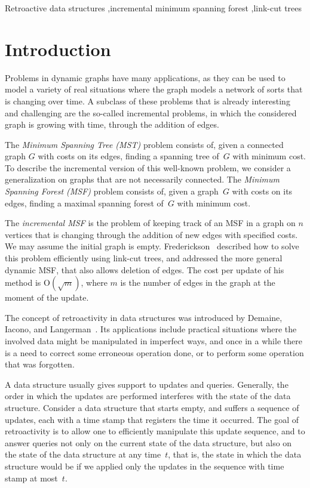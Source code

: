 \documentclass[3p,times,procedia]{elsarticle}
\newcommand{\Oh}{\mathrm{O}}
\begin{document}
\begin{frontmatter}
\begin{keyword}
    Retroactive data structures \sep incremental minimum spanning forest \sep link-cut trees
\end{keyword}

\end{frontmatter}


\section{Introduction}

Problems in dynamic graphs have many applications, as they can be used to model a variety 
of real situations where the graph models a network of sorts that is changing over time. 
A subclass of these problems that is already interesting and challenging are the so-called 
incremental problems, in which the considered graph is growing with time, through the 
addition of edges.  

The \emph{Minimum Spanning Tree (MST)} problem consists of, given a connected 
graph $G$ with costs on its edges, finding a spanning tree of~$G$ with minimum cost. 
To describe the incremental version of this well-known problem, 
we consider a generalization on graphs that are not necessarily connected. 
The \emph{Minimum Spanning Forest (MSF)} problem consists of, given a graph~$G$ with 
costs on its edges, finding a maximal spanning forest of~$G$ with minimum cost. 

The \emph{incremental MSF} is the problem of keeping track of an MSF in a graph on 
$n$ vertices that is changing through the addition of new edges with specified costs.  
We may assume the initial graph is empty. 
Frederickson~\cite{Frederickson1983} described how to solve this problem efficiently 
using link-cut trees, and addressed the more general dynamic MSF,
that also allows deletion of edges.  The cost per update of his method is $\Oh(\sqrt{m})$, 
where $m$ is the number of edges in the graph at the moment of the update.

The concept of retroactivity in data structures was introduced by Demaine, Iacono, 
and Langerman~\cite{DemaineIL2007}.  Its applications include practical situations 
where the involved data might be manipulated in imperfect ways, and once in a while 
there is a need to correct some erroneous operation done, or to perform some operation 
that was forgotten.

A data structure usually gives support to updates and queries.  
Generally, the order in which the updates are performed interferes with the state 
of the data structure. 
Consider a data structure that starts empty, and suffers a sequence of updates, 
each with a time stamp that registers the time it occurred. 
The goal of retroactivity is to allow one to efficiently manipulate this update sequence, 
and to answer queries not only on the current state of the data structure, 
but also on the state of the data structure at any time~$t$, that is, 
the state in which the data structure would be if we applied only the updates 
in the sequence with time stamp at most~$t$.
\end{document}
